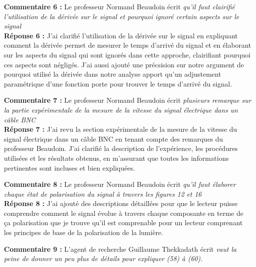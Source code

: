 \documentclass[superscriptaddress,12pt]{article}
\begin{document}
\vspace{1cm}

\textbf{Commentaire 6 :} Le professeur Normand Beaudoin écrit \textit{qu'il faut clairifié l'utilisation de la dérivée sur le signal et pourquoi ignoré certain aspects sur le signal} \\

\textbf{Réponse 6 :} J'ai clarifié l'utilisation de la dérivée sur le signal en expliquant
comment la dérivée permet de mesurer le temps d'arrivé du signal et  
en élaborant sur les aspects du signal qui sont ignorés dans cette approche, clairifiant 
pourquoi ces aspects sont négligés. J'ai aussi ajouté une précsision sur notre argument de pourquoi utilisé la
dérivée dans notre analyse apport qu'un adjustement paramétrique d'une fonction porte pour trouver le temps d'arrivé du signal.

\vspace{1cm}

\textbf{Commentaire 7 :} Le professeur Normand Beaudoin écrit \textit{plusieurs remarque sur la partie expérimentale de la mesure de la vitesse du signal électrique dans un câble BNC} \\

\textbf{Réponse 7 :} J'ai revu la section expérimentale de la mesure de la vitesse du signal électrique dans un câble BNC en tenant compte des remarques du professeur Beaudoin. J'ai clarifié la description de l'expérience, les procédures utilisées et les résultats obtenus, en m'assurant que toutes les informations pertinentes sont incluses et bien expliquées.

\vspace{1cm}

\textbf{Commentaire 8 :} Le professeur Normand Beaudoin écrit \textit{qu'il faut élaborer chaque état de polarisation du signal à travers les figures 12 et 16} \\

\textbf{Réponse 8 :} J'ai ajouté des descriptions détaillées pour que le lecteur puisse comprendre comment le signal évolue à travers chaque composante en terme de ça polarisation que je trouve qu'il est comprenable pour un lecteur 
comprenant les principes de base de la polarisation de la lumière. 

\vspace{1cm}

\textbf{Commentaire 9 :} L'agent de recherche Guillaume Thekkadath écrit \textit{vaut la peine de donner un peu plus de détails pour expliquer (58) à (60). } \\
\end{document}
